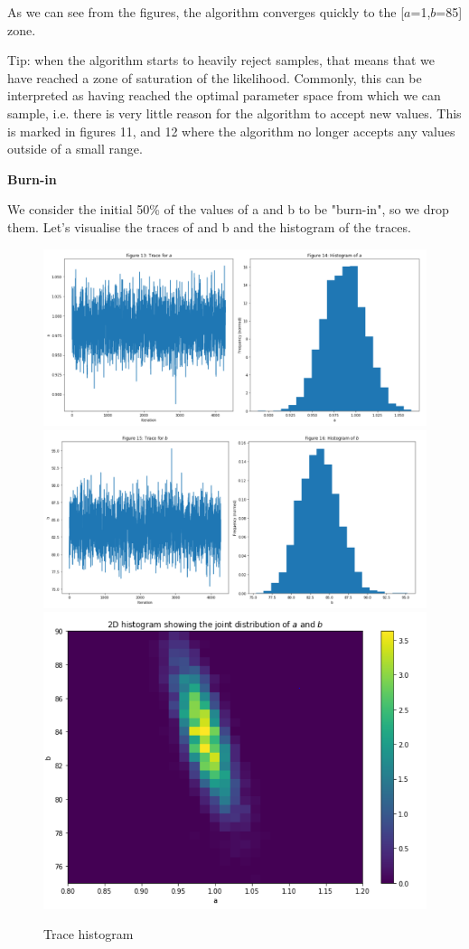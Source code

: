 As we can see from the figures, the algorithm converges quickly to the [$a$=1,$b$=85] zone.

Tip: when the algorithm starts to heavily reject samples, that means that we have reached a zone of saturation of the likelihood. Commonly, this can be interpreted as having reached the optimal parameter space from which we can sample, i.e. there is very little reason for the algorithm to accept new values. This is marked in figures 11, and 12 where the algorithm no longer accepts any values outside of a small range.

\textbf{Burn-in}

We consider the initial 50\% of the values of a and b to be "burn-in", so we drop them. Let's visualise the traces of and b and the histogram of the traces.


\begin{figure}[h]
    \centering
\includegraphics[width=.8\textwidth]{pic/p05c09-snip12}
\includegraphics[width=.8\textwidth]{pic/p05c09-snip13}
\includegraphics[width=.8\textwidth]{pic/p05c09-snip14}
    \caption{Trace histogram}
    \label{fig:p05c09-snip12}
\end{figure}


